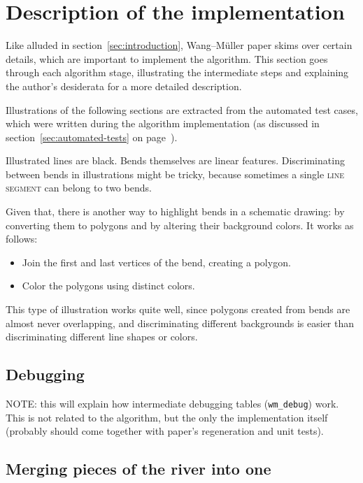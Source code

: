 \documentclass[a4paper]{article}
\newcommand{\onpage}[1]{\ref{#1} on page~\pageref{#1}}
\newcommand{\WM}{Wang--M{\"u}ller}
\begin{document}
\section{Description of the implementation}

Like alluded in section~\ref{sec:introduction}, {\WM} paper skims over
certain details, which are important to implement the algorithm. This section
goes through each algorithm stage, illustrating the intermediate steps and
explaining the author's desiderata for a more detailed description.

Illustrations of the following sections are extracted from the automated test
cases, which were written during the algorithm implementation (as discussed in
section~\onpage{sec:automated-tests}).

Illustrated lines are black. Bends themselves are linear features.
Discriminating between bends in illustrations might be tricky, because
sometimes a single \textsc{line segment} can belong to two bends.

Given that, there is another way to highlight bends in a schematic drawing: by
converting them to polygons and by altering their background colors. It works
as follows:

\begin{itemize}
    \item Join the first and last vertices of the bend, creating a polygon.
    \item Color the polygons using distinct colors.
\end{itemize}

This type of illustration works quite well, since polygons created from bends
are almost never overlapping, and discriminating different backgrounds is
easier than discriminating different line shapes or colors.

\subsection{Debugging}

NOTE: this will explain how intermediate debugging tables (\texttt{wm\_debug})
work. This is not related to the algorithm, but the only the implementation
itself (probably should come together with paper's regeneration and unit
tests).

\subsection{Merging pieces of the river into one}
\end{document}
